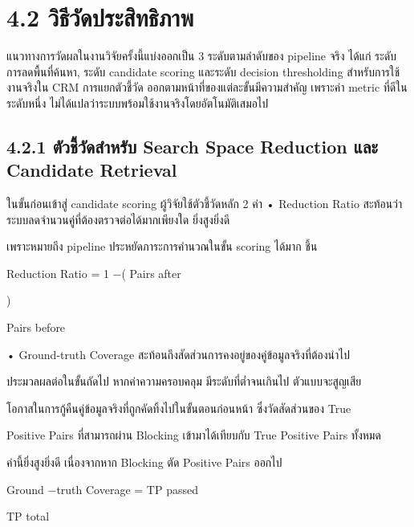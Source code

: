 \documentclass[12pt,a4paper]{report}
\begin{document}
\section*{4.2 วิธีวัดประสิทธิภาพ}
แนวทางการวัดผลในงานวิจัยครั้งนี้แบ่งออกเป็น 3 ระดับตามลำดับของ pipeline จริง ได้แก่ ระดับการลดพื้นที่ค้นหา, ระดับ candidate scoring และระดับ decision thresholding สำหรับการใช้งานจริงใน CRM การแยกตัวชี้วัด ออกตามหน้าที่ของแต่ละขั้นมีความสำคัญ เพราะค่า metric ที่ดีในระดับหนึ่ง ไม่ได้แปลว่าระบบพร้อมใช้งานจริงโดยอัตโนมัติเสมอไป\par
\subsection*{4.2.1 ตัวชี้วัดสำหรับ Search Space Reduction และ Candidate Retrieval}
ในขั้นก่อนเข้าสู่ candidate scoring ผู้วิจัยใช้ตัวชี้วัดหลัก 2 ค่า • Reduction Ratio สะท้อนว่าระบบลดจำนวนคู่ที่ต้องตรวจต่อได้มากเพียงใด ยิ่งสูงยิ่งดี\par
เพราะหมายถึง pipeline ประหยัดภาระการคำนวณในขั้น scoring ได้มาก ชึ้น\par
Reduction Ratio = 1 −( Pairs after\par
)\par
Pairs before\par
\noindent • Ground-truth Coverage สะท้อนถึงสัดส่วนการคงอยู่ของคู่ข้อมูลจริงที่ต้องนำไป\par
ประมวลผลต่อในขั้นถัดไป หากค่าความครอบคลุม มีระดับที่ต่ำจนเกินไป ตัวแบบจะสูญเสีย\par
โอกาสในการกู้คืนคู่ข้อมูลจริงที่ถูกคัดทิ้งไปในขั้นตอนก่อนหน้า ซึ่งวัดสัดส่วนของ True\par
Positive Pairs ที่สามารถผ่าน Blocking เข้ามาได้เทียบกับ True Positive Pairs ทั้งหมด\par
ค่านี้ยิ่งสูงยิ่งดี เนื่องจากหาก Blocking ตัด Positive Pairs ออกไป\par
Ground −truth Coverage = TP passed\par
TP total\par
\clearpage
\end{document}
